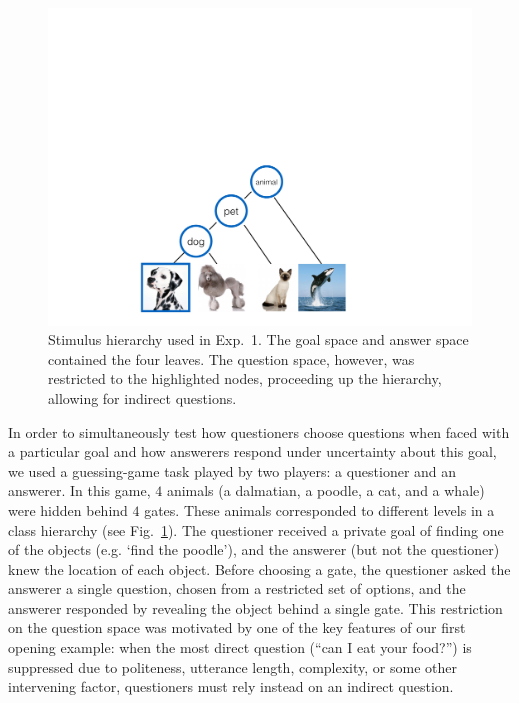 \documentclass[12pt, floatsintext, jou]{apa6}
\begin{document}
%

\begin{figure}[t!]
\begin{center}
\includegraphics[scale = .35]{taskhierarchy.pdf}
\end{center}
\vspace{-.25cm}
\caption{Stimulus hierarchy used in Exp.~1. The goal space and answer space contained the four leaves. %
The question space, however, was restricted to the highlighted nodes, proceeding up the hierarchy, allowing for indirect questions.}
\label{fig:taskhierarchy}
\end{figure}

In order to simultaneously test how questioners choose questions when faced with a particular goal and how answerers respond  under uncertainty about this goal, we used a guessing-game task played by two players: a questioner and an answerer. In this game, $4$ animals (a dalmatian, a poodle, a cat, and a whale) were hidden behind $4$ gates. These animals corresponded to different levels in a class hierarchy (see Fig.~\ref{fig:taskhierarchy}). The questioner received a private goal of finding one of the objects (e.g. `find the poodle'), and the answerer (but not the questioner) knew the location of each object. Before choosing a gate, the questioner asked the answerer a single question, chosen from a restricted set of options, and the answerer responded by revealing the object behind a single gate. This restriction on the question space was motivated by one of the key features of our first opening example: when the most direct question (``can I eat your food?'') is suppressed due to politeness, utterance length, complexity, or some other intervening factor, questioners must rely instead on an indirect question. 
\end{document}
